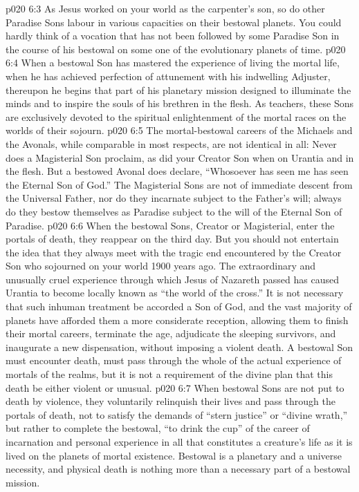 \vs p020 6:3 As Jesus worked on your world as the carpenter’s son, so do other Paradise Sons labour in various capacities on their bestowal planets. You could hardly think of a vocation that has not been followed by some Paradise Son in the course of his bestowal on some one of the evolutionary planets of time.
\vs p020 6:4 When a bestowal Son has mastered the experience of living the mortal life, when he has achieved perfection of attunement with his indwelling Adjuster, thereupon he begins that part of his planetary mission designed to illuminate the minds and to inspire the souls of his brethren in the flesh. As teachers, these Sons are exclusively devoted to the spiritual enlightenment of the mortal races on the worlds of their sojourn.
\vs p020 6:5 \pc The mortal\hyp{}bestowal careers of the Michaels and the Avonals, while comparable in most respects, are not identical in all: Never does a Magisterial Son proclaim,  as did your Creator Son when on Urantia and in the flesh. But a bestowed Avonal does declare, “Whosoever has seen me has seen the Eternal Son of God.” The Magisterial Sons are not of immediate descent from the Universal Father, nor do they incarnate subject to the Father’s will; always do they bestow themselves as Paradise  subject to the will of the Eternal Son of Paradise.
\vs p020 6:6 \pc When the bestowal Sons, Creator or Magisterial, enter the portals of death, they reappear on the third day. But you should not entertain the idea that they always meet with the tragic end encountered by the Creator Son who sojourned on your world 1900 years ago. The extraordinary and unusually cruel experience through which Jesus of Nazareth passed has caused Urantia to become locally known as “the world of the cross.” It is not necessary that such inhuman treatment be accorded a Son of God, and the vast majority of planets have afforded them a more considerate reception, allowing them to finish their mortal careers, terminate the age, adjudicate the sleeping survivors, and inaugurate a new dispensation, without imposing a violent death. A bestowal Son must encounter death, must pass through the whole of the actual experience of mortals of the realms, but it is not a requirement of the divine plan that this death be either violent or unusual.
\vs p020 6:7 When bestowal Sons are not put to death by violence, they voluntarily relinquish their lives and pass through the portals of death, not to satisfy the demands of “stern justice” or “divine wrath,” but rather to complete the bestowal, “to drink the cup” of the career of incarnation and personal experience in all that constitutes a creature’s life as it is lived on the planets of mortal existence. Bestowal is a planetary and a universe necessity, and physical death is nothing more than a necessary part of a bestowal mission.
